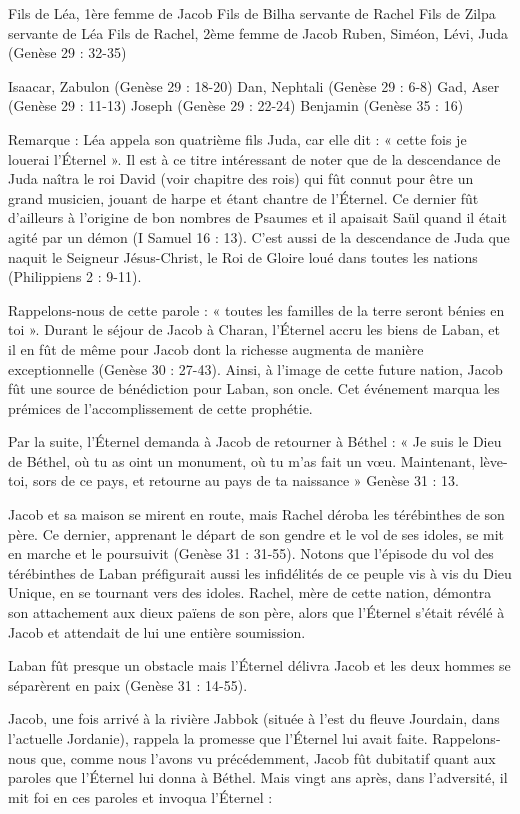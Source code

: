 Fils de Léa, 1ère femme de Jacob
Fils de Bilha servante de Rachel
Fils de Zilpa servante de Léa
Fils de Rachel, 2ème femme de Jacob
Ruben, Siméon, Lévi,
Juda (Genèse 29 : 32-35)

Isaacar, Zabulon (Genèse 29 : 18-20)
Dan, Nephtali (Genèse 29 : 6-8)
Gad, Aser (Genèse 29 : 11-13)
Joseph (Genèse 29 : 22-24)
Benjamin (Genèse 35 : 16)

Remarque : Léa appela son quatrième fils Juda, car elle dit : « cette fois je louerai l’Éternel ». Il est à ce titre intéressant de noter que de la descendance de Juda naîtra le roi David (voir chapitre des rois) qui fût connut pour être un grand musicien, jouant de harpe et étant chantre de l’Éternel. Ce dernier fût d'ailleurs à l'origine de bon nombres de Psaumes et il apaisait Saül quand il était agité par un démon (I Samuel 16 : 13). C'est aussi de la descendance de Juda que naquit le Seigneur Jésus-Christ, le Roi de Gloire loué dans toutes les nations (Philippiens 2 : 9-11).

Rappelons-nous de cette parole : « toutes les familles de la terre seront bénies en toi ». Durant le séjour de Jacob à Charan, l’Éternel accru les biens de Laban, et il en fût de même pour Jacob dont la richesse augmenta de manière exceptionnelle (Genèse 30 : 27-43). Ainsi, à l'image de cette future nation, Jacob fût une source de bénédiction pour Laban, son oncle. Cet événement marqua les prémices de l'accomplissement de cette prophétie.

Par la suite, l’Éternel demanda à Jacob de retourner à Béthel : « Je suis le Dieu de Béthel, où tu as oint un monument, où tu m'as fait un vœu. Maintenant, lève-toi, sors de ce pays, et retourne au pays de ta naissance » Genèse 31 : 13.

Jacob et sa maison se mirent en route, mais Rachel déroba les térébinthes de son père. Ce dernier, apprenant le départ de son gendre et le vol de ses idoles, se mit en marche et le poursuivit (Genèse 31 : 31-55). Notons que l'épisode du vol des térébinthes de Laban préfigurait aussi les infidélités de ce peuple vis à vis du Dieu Unique, en se tournant vers des idoles. Rachel, mère de cette nation, démontra son attachement aux dieux païens de son père, alors que l’Éternel s'était révélé à Jacob et attendait de lui une entière soumission.

Laban fût presque un obstacle mais l’Éternel délivra Jacob et les deux hommes se séparèrent en paix (Genèse 31 : 14-55).

Jacob, une fois arrivé à la rivière Jabbok (située à l'est du fleuve Jourdain, dans l'actuelle Jordanie), rappela la promesse que l’Éternel lui avait faite. Rappelons-nous que, comme nous l'avons vu précédemment, Jacob fût dubitatif quant aux paroles que l’Éternel lui donna à Béthel. Mais vingt ans après, dans l'adversité, il mit foi en ces paroles et invoqua l’Éternel :

